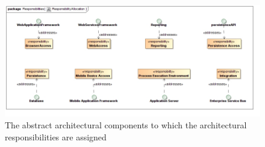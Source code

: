 \begin{figure}[H]
	\begin{center}
	\includegraphics[scale=0.4]{../Diagrams and Charts/Architecture/ResponsibilityAllocation.jpg}
	\caption{The abstract architectural components to which the architectural responsibilities are assigned}
	\end{center}
	\label{ref:responsibilityAllocation}
\end{figure}